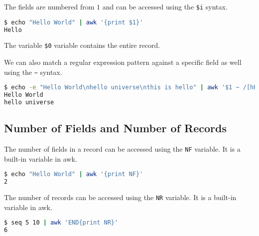 The fields are numbered from $1$ and can be accessed using the \lstinline|$i| syntax.

\begin{lstlisting}[language=bash]
$ echo "Hello World" | awk '{print $1}'
Hello
\end{lstlisting}

The variable \lstinline|$0| variable contains the entire record.

We can also match a regular expression pattern against a specific field as well using the \lstinline|~| syntax.

\begin{lstlisting}[language=bash]
$ echo -e "Hello World\nhello universe\nthis is hello" | awk '$1 ~ /[hH]ello/'
Hello World
hello universe
\end{lstlisting}

\subsection{Number of Fields and Number of Records}

The number of fields in a record can be accessed using the \lstinline|NF| variable. It is a built-in variable in awk.

\begin{lstlisting}[language=bash]
$ echo "Hello World" | awk '{print NF}'
2
\end{lstlisting}

The number of records can be accessed using the \lstinline|NR| variable. It is a built-in variable in awk.

\begin{lstlisting}[language=bash]
$ seq 5 10 | awk 'END{print NR}'
6
\end{lstlisting}


